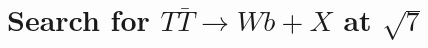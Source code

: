\clearpage{\pagestyle{empty}\cleardoublepage}

\chapter{Search for $T\bar{T}\to Wb+X$ at $\sqrt{7}~$\tev}\label{chap:wbx7tev}
